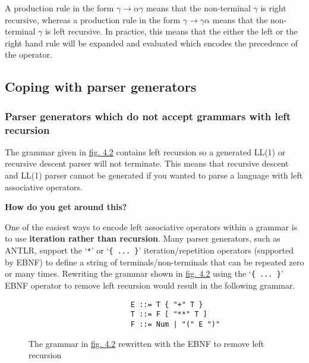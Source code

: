 \documentclass[12pt, letterpaper]{article}
\theoremstyle{definition}
\begin{document}
A production rule in the form $\gamma \rightarrow \alpha \gamma$ means that the non-terminal $\gamma$ is right recursive, whereas a production rule in the form $\gamma \rightarrow \gamma \alpha$ means that the non-terminal $\gamma$ is left recursive. In practice, this means that the either the left or the right hand rule will be expanded and evaluated which encodes the precedence of the operator.\textsuperscript{\cite{abrahamson_2021}\cite{lam_2019}}

\subsection{Coping with parser generators}

\subsubsection{Parser generators which do not accept grammars with left recursion}

The grammar given in \hyperref[fig:4.2]{fig. 4.2} contains left recursion so a generated LL(1) or recursive descent parser will not terminate. This means that recursive descent and LL(1) parser cannot be generated if you wanted to parse a language with left associative operators.

\begin{center}
    \textbf{How do you get around this?}
\end{center}

One of the easiest ways to encode left associative operators within a grammar is to use \textbf{iteration rather than recursion}. Many parser generators, such as ANTLR, support the `\verb|*|' or `\verb|{ ... }|' iteration/repetition operators (supported by EBNF) to define a string of terminals/non-terminals that can be repeated zero or many times. Rewriting the grammar shown in \hyperref[fig:4.2]{fig. 4.2} using the `\verb|{ ... }|' EBNF operator to remove left recursion would result in the following grammar.\textsuperscript{\cite{pattis_2021}}

\begin{figure}[H]
    \begin{center}
        \begin{verbatim}
                        E ::= T { "+" T }
                        T ::= F [ "**" T ]
                        F ::= Num | "(" E ")"
        \end{verbatim}
    \end{center}
    \vspace{-1.5em}
    \caption{\label{fig:4.3}The grammar in \hyperref[fig:4.2]{fig. 4.2} rewritten with the EBNF to remove left recursion}
\end{figure}
\end{document}
